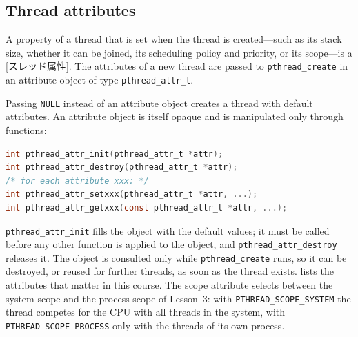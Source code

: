 \documentclass[../main.tex]{subfiles}
\begin{document}
\subsection{Thread attributes}
\label{sec:l04-attr}

\begin{definition}
  A property of a thread that is set when the thread is created---such as
  its stack size, whether it can be joined, its scheduling policy and
  priority, or its scope---is a [スレッド属性].  The
  attributes of a new thread are passed to \texttt{pthread\_create} in an
  attribute object of type \texttt{pthread\_attr\_t}.
\end{definition}

Passing \texttt{NULL} instead of an attribute object creates a thread with
default attributes.  An attribute object is itself
opaque and is manipulated only through functions:
\begin{lstlisting}[language=C, numbers=none]
int pthread_attr_init(pthread_attr_t *attr);
int pthread_attr_destroy(pthread_attr_t *attr);
/* for each attribute xxx: */
int pthread_attr_setxxx(pthread_attr_t *attr, ...);
int pthread_attr_getxxx(const pthread_attr_t *attr, ...);
\end{lstlisting}
\texttt{pthread\_attr\_init} fills the object with the default values; it
must be called before any other function is applied to the object, and
\texttt{pthread\_attr\_destroy} releases it.  The object is consulted only
while \texttt{pthread\_create} runs, so it can be destroyed, or reused for
further threads, as soon as the thread
exists.
 lists the attributes that matter in this course.  The scope attribute
selects between the system scope and the process scope of Lesson~3: with
\texttt{PTHREAD\_SCOPE\_SYSTEM} the thread competes for the CPU with all
threads in the system, with \texttt{PTHREAD\_SCOPE\_PROCESS} only with the
threads of its own process.
\end{document}
